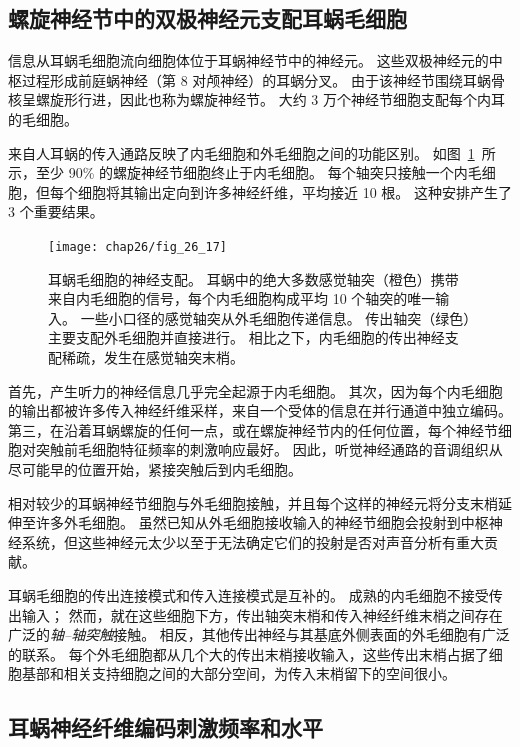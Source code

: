 \subsection{螺旋神经节中的双极神经元支配耳蜗毛细胞}

信息从耳蜗毛细胞流向细胞体位于耳蜗神经节中的神经元。
这些双极神经元的中枢过程形成前庭蜗神经（第 8 对颅神经）的耳蜗分叉。
由于该神经节围绕耳蜗骨核呈螺旋形行进，因此也称为螺旋神经节。
大约 3 万个神经节细胞支配每个内耳的毛细胞。


来自人耳蜗的传入通路反映了内毛细胞和外毛细胞之间的功能区别。
如图~\ref{fig:26_17}~所示，至少 90\% 的螺旋神经节细胞终止于内毛细胞。
每个轴突只接触一个内毛细胞，但每个细胞将其输出定向到许多神经纤维，平均接近 10 根。
这种安排产生了 3 个重要结果。


\begin{figure}[htbp]
	\centering
	\texttt{[image: chap26/fig\_26\_17]}
	\caption{耳蜗毛细胞的神经支配。
		耳蜗中的绝大多数感觉轴突（橙色）携带来自内毛细胞的信号，每个内毛细胞构成平均 10 个轴突的唯一输入。
		一些小口径的感觉轴突从外毛细胞传递信息。
		传出轴突（绿色）主要支配外毛细胞并直接进行。
		相比之下，内毛细胞的传出神经支配稀疏，发生在感觉轴突末梢\cite{spoendlin1974neuroanatomy}。}
	\label{fig:26_17}
\end{figure}


首先，产生听力的神经信息几乎完全起源于内毛细胞。
其次，因为每个内毛细胞的输出都被许多传入神经纤维采样，来自一个受体的信息在并行通道中独立编码。
第三，在沿着耳蜗螺旋的任何一点，或在螺旋神经节内的任何位置，每个神经节细胞对突触前毛细胞特征频率的刺激响应最好。
因此，听觉神经通路的音调组织从尽可能早的位置开始，紧接突触后到内毛细胞。


相对较少的耳蜗神经节细胞与外毛细胞接触，并且每个这样的神经元将分支末梢延伸至许多外毛细胞。
虽然已知从外毛细胞接收输入的神经节细胞会投射到中枢神经系统，但这些神经元太少以至于无法确定它们的投射是否对声音分析有重大贡献。


耳蜗毛细胞的传出连接模式和传入连接模式是互补的。
成熟的内毛细胞不接受传出输入；
然而，就在这些细胞下方，传出轴突末梢和传入神经纤维末梢之间存在广泛的\textit{轴–轴突触}接触。
相反，其他传出神经与其基底外侧表面的外毛细胞有广泛的联系。
每个外毛细胞都从几个大的传出末梢接收输入，这些传出末梢占据了细胞基部和相关支持细胞之间的大部分空间，为传入末梢留下的空间很小。



\subsection{耳蜗神经纤维编码刺激频率和水平}

